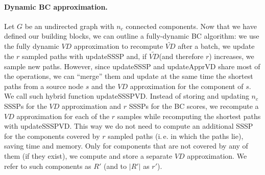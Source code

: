 \documentclass[english]{llncs}
\newcommand{\ie}{i.\,e.\xspace}
\newcommand{\vd}{$\mathit{VD}$\xspace}
\newcommand{\vda}{$\tilde{\mathit{VD}}$\xspace}
\begin{document}
\paragraph{Dynamic BC approximation.}
Let $G$ be an undirected graph with $n_c$ connected components. Now that we have defined our building blocks, we can outline a fully-dynamic BC algorithm: we use the fully dynamic \vd approximation to recompute \vda after a batch, we update the $r$ sampled paths with \textsf{updateSSSP} and, if \vda (and therefore $r$) increases, we sample new paths. However, since \textsf{updateSSSP} and \textsf{updateApprVD} share most of the operations, we can ``merge'' them and update at the same time the shortest paths from a source node $s$ and the \vd approximation for the component of $s$. We call such hybrid function \textsf{updateSSSPVD}. Instead of storing and updating $n_c$ SSSPs for the \vd approximation and $r$ SSSPs for the BC scores, we 
recompute a \vd approximation for each of the $r$ samples while recomputing the shortest paths with \textsf{updateSSSPVD}. This way we do not need to compute an additional SSSP for the components covered by $r$ sampled paths (\ie in which the paths lie), saving time and memory. Only for components that are not covered by any of them (if they exist), we compute and store a separate \vd approximation. We refer to such components as $R'$ (and to $|R'|$ as $r'$). 
\end{document}
